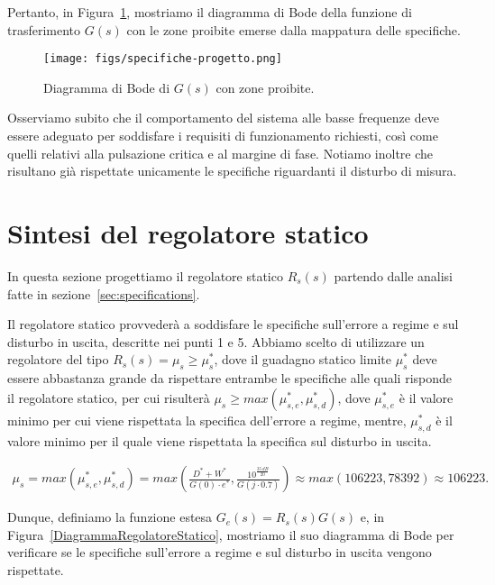 \documentclass[a4paper, 11pt]{article}
\begin{document}
Pertanto, in Figura~\ref{fig2:bode_diagram}, mostriamo il diagramma di Bode della funzione di trasferimento $G(s)$ con le zone proibite emerse dalla mappatura delle specifiche.

\newpage
\begin{figure}[H]
    \centering
    \texttt{[image: figs/specifiche-progetto.png]}
    \caption{Diagramma di Bode di $G(s)$ con zone proibite.}
    \label{fig2:bode_diagram}
\end{figure}

Osserviamo subito che il comportamento del sistema alle basse frequenze deve essere adeguato per soddisfare i requisiti di funzionamento richiesti, così come quelli relativi alla pulsazione critica e al margine di fase. Notiamo inoltre che risultano già rispettate unicamente le specifiche riguardanti il disturbo di misura.

\newpage

\section{Sintesi del regolatore statico}
\label{sec:static_regulator}

In questa sezione progettiamo il regolatore statico $R_s(s)$ partendo dalle analisi fatte in sezione~\ref{sec:specifications}.

Il regolatore statico provvederà a soddisfare le specifiche sull'errore a regime e sul disturbo in uscita, descritte nei punti 1 e 5. Abbiamo scelto di utilizzare un regolatore del tipo $R_s(s) = \mu_s \geq \mu_s^*$, dove il guadagno statico limite $\mu_s^*$ deve essere abbastanza grande da rispettare entrambe le specifiche alle quali risponde il regolatore statico, per cui risulterà $\mu_s \geq max(\mu_{s,e}^*,\mu_{s,d}^*)$, dove $\mu_{s,e}^*$ è il valore minimo per cui viene rispettata la specifica dell'errore a regime, mentre, $\mu_{s,d}^*$ è il valore minimo per il quale viene rispettata la specifica sul disturbo in uscita.

\begin{align}  
    \mu_s = max(\mu_{s,e}^*,\mu_{s,d}^*) = max(\frac {D^* + W^*} {G(0) \cdot e^*}, \frac {10^{\frac {35 \ dB} {20}}} {G(j \cdot 0.7)}) \approx max(106223, 78392) \approx 106223.
\end{align}

Dunque, definiamo la funzione estesa $G_e(s) = R_s(s)G(s)$ e, in Figura~\ref{DiagrammaRegolatoreStatico}, mostriamo il suo diagramma di Bode per verificare se le specifiche sull'errore a regime e sul disturbo in uscita vengono rispettate.
\end{document}
